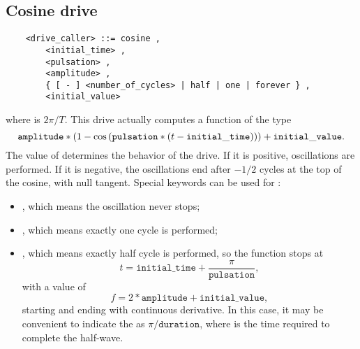 \subsection{Cosine drive}
\begin{verbatim}
    <drive_caller> ::= cosine ,
        <initial_time> ,
        <pulsation> ,
        <amplitude> ,
        { [ - ] <number_of_cycles> | half | one | forever } , 
        <initial_value>
\end{verbatim}
where  is $2\pi/T$.
This drive actually computes a function of the type
\begin{displaymath}
	\mathtt{amplitude} * \left( 
		1 - \mathrm{cos}\left( 
			\mathtt{pulsation} * \left( 
				t - \mathtt{initial\_time}
			 \right)
		 \right)
	 \right) + \mathtt{initial\_value} .
\end{displaymath}
The value of  determines the behavior of the
drive. 
If it is positive,  oscillations are performed.
If it is negative, the oscillations end after
$-1/2$ cycles at the top of the cosine, with null
tangent.   
Special keywords can be used for :
\begin{itemize}
	\item {}, which means the oscillation never stops;
	\item {}, which means exactly one cycle is performed;
	\item {}, which means exactly half cycle is performed,
	so the function stops at
	\begin{displaymath}
		t = \mathtt{initial\_time} + \frac{\pi}{\mathtt{pulsation}} ,
	\end{displaymath}
	with a value of
	\begin{displaymath}
		f = 2 * \mathtt{amplitude} + \mathtt{initial\_value} ,
	\end{displaymath}
	starting and ending with continuous derivative.
	In this case, it may be convenient to indicate the 
	as $\pi/\mathtt{duration}$, where  is the time
	required to complete the half-wave.
\end{itemize}


